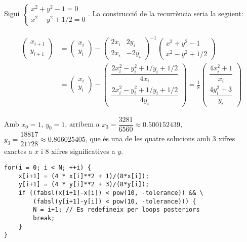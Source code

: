 \begin{example}
    Sigui $\begin{cases} x^{2} + y^{2} - 1 = 0 \\ x^{2} - y^{2} + 1/2 = 0 \end{cases}$. La construcció de la recurrència seria la següent:
    
    \begin{align*}
    \begin{aligned}
        \begin{pmatrix} 
            x_{i+1} \\ 
            y_{i+1} 
        \end{pmatrix} 
        & = \begin{pmatrix} 
            x_{i} \\ 
            y_{i} 
        \end{pmatrix} 
        - \begin{pmatrix} 
            2x_{i} & 2y_{i} \\ 
            2x_{i} & -2y_{i} 
        \end{pmatrix}^{-1} 
        \begin{pmatrix} 
            x^{2} + y^{2} - 1 \\ 
            x^{2} - y^{2} + 1/2 
        \end{pmatrix} \\
        & = \begin{pmatrix} 
            x_{i} \\ 
            y_{i} 
        \end{pmatrix} 
        - \begin{pmatrix} 
            \dfrac{2x_{i}^{2} -y_{i}^{2} + 1/y_{i} + 1/2 }{4x_{i}} \\ 
            \dfrac{2x_{i}^{2} -y_{i}^{2} + 1/y_{i} + 1/2 }{4y_{i}}
        \end{pmatrix}
        = \frac{1}{8}\begin{pmatrix} 
            \dfrac{4x_{i}^{2} + 1}{x_{i}} \\ 
            \dfrac{4y_{i}^{2} + 3}{y_{i}}
        \end{pmatrix}
    \end{aligned}
    \end{align*}

    Amb $x_{0} = 1$, $y_{0} = 1$, arribem a $x_{3} = \dfrac{3281}{6560} \approx \num{0.500152439}$, $y_{3} = \dfrac{18817}{21728} \approx \num{0.866025405}$, que és una de les quatre solucions amb 3 xifres exactes a $x$ i 8 xifres significatives a $y$.
        
\begin{Verbatim}
for(i = 0; i < N; ++i) {
	x[i+1] = (4 * x[i]**2 + 1)/(8*x[i]);
	y[i+1] = (4 * y[i]**2 + 3)/(8*y[i]);
	if ((fabsl(x[i+1]-x[i]) < pow(10, -tolerance)) && \
	    (fabsl(y[i+1]-y[i]) < pow(10, -tolerance))) {
		N = i+1; // Es redefineix per loops posteriors
		break;
	}
}
\end{Verbatim}
\end{example}

